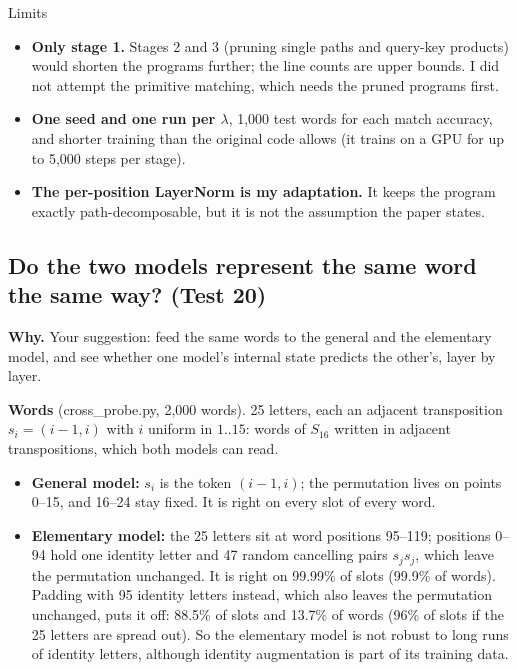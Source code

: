 \documentclass[paper=a4,fontsize=11pt,DIV=11,parskip=half,headings=small,numbers=noendperiod]{scrartcl}
\DeclareRobustCommand{\lead}[1]{\textsf{\bfseries\color{accent}#1}}
\DeclareRobustCommand{\code}[1]{{\fontseries{m}\ttfamily #1}}
\begin{document}
\begin{limbox}{Limits}
\begin{itemize}
\item \lead{Only stage 1.} Stages 2 and 3 (pruning single paths and query-key products) would shorten the
  programs further; the line counts are upper bounds. I did not attempt the primitive matching, which needs the
  pruned programs first.
\item \lead{One seed and one run per $\lambda$}, 1,000 test words for each match accuracy, and shorter training
  than the original code allows (it trains on a GPU for up to 5,000 steps per stage).
\item \lead{The per-position LayerNorm is my adaptation.} It keeps the program exactly path-decomposable, but it
  is not the assumption the paper states.
\end{itemize}
\end{limbox}

\subsection{Do the two models represent the same word the same way? (Test 20)}\label{sec:3.23}
\lead{Why.} Your suggestion: feed the same words to the general and the elementary model, and see whether one
model’s internal state predicts the other’s, layer by layer.

\lead{Words} (\code{cross\_\allowbreak{}probe.\allowbreak{}py}, 2,000 words). 25 letters, each an adjacent
transposition $s_i=(i-1,i)$ with $i$ uniform in $1..15$: words of $S_{16}$ written in adjacent transpositions,
which both models can read.

\begin{itemize}
\item \lead{General model:} $s_i$ is the token $(i-1,i)$; the permutation lives on points 0–15, and 16–24 stay
  fixed. It is right on every slot of every word.
\item \lead{Elementary model:} the 25 letters sit at word positions 95–119; positions 0–94 hold one identity
  letter and 47 random cancelling pairs $s_js_j$, which leave the permutation unchanged. It is right on 99.99\%
  of slots (99.9\% of words). Padding with 95 identity letters instead, which also leaves the permutation
  unchanged, puts it off: 88.5\% of slots and 13.7\% of words (96\% of slots if the 25 letters are spread out).
  So the elementary model is not robust to long runs of identity letters, although identity augmentation is part
  of its training data.
\end{itemize}
\end{document}
